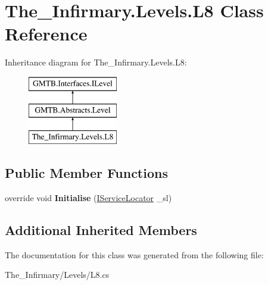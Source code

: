 \hypertarget{class_the___infirmary_1_1_levels_1_1_l8}{}\section{The\+\_\+\+Infirmary.\+Levels.\+L8 Class Reference}
\label{class_the___infirmary_1_1_levels_1_1_l8}
Inheritance diagram for The\+\_\+\+Infirmary.\+Levels.\+L8\+:\begin{figure}[H]
\begin{center}
\leavevmode
\includegraphics[height=3.000000cm]{class_the___infirmary_1_1_levels_1_1_l8}
\end{center}
\end{figure}
\subsection*{Public Member Functions}
\begin{DoxyCompactItemize}
\item 
\mbox{\label{class_the___infirmary_1_1_levels_1_1_l8_af246318b7f74c9491887facd3d6face0}} 
override void {\bfseries Initialise} (\mbox{\hyperlink{interface_g_m_t_b_1_1_interfaces_1_1_i_service_locator}{I\+Service\+Locator}} \+\_\+sl)
\end{DoxyCompactItemize}
\subsection*{Additional Inherited Members}


The documentation for this class was generated from the following file\+:\begin{DoxyCompactItemize}
\item 
The\+\_\+\+Infirmary/\+Levels/L8.\+cs\end{DoxyCompactItemize}
